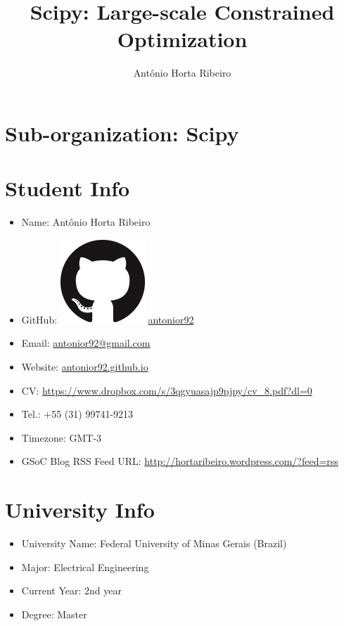 \documentclass[11pt]{article}
\title{Scipy: Large-scale Constrained Optimization}
\author{Ant\^{o}nio Horta Ribeiro}
\date{}
\begin{document}
\maketitle

\section*{Sub-organization: Scipy}

\section*{Student Info}

\begin{itemize}
\item
  Name: Ant\^{o}nio Horta Ribeiro
\item
  GitHub: \includegraphics[height=\baselineskip]{GH.png} \href{https://github.com/antonior92}{antonior92}
\item
  Email: \href{mailto:antonior92@gmail.com}{antonior92@gmail.com}
\item
  Website: \href{https://antonior92.github.io}{antonior92.github.io}
\item
  CV: \href{https://www.dropbox.com/s/3qgyuasajp9pjpy/cv_8.pdf?dl=0}{https://www.dropbox.com/s/3qgyuasajp9pjpy/cv\_8.pdf?dl=0}
\item
  Tel.: +55 (31) 99741-9213
\item
  Timezone: GMT-3
\item
  GSoC Blog RSS Feed URL:  \href{http://hortaribeiro.wordpress.com/?feed=rss}{http://hortaribeiro.wordpress.com/?feed=rss}
\end{itemize}


\section*{University Info}

\begin{itemize}
\item
  University Name: Federal University of Minas Gerais (Brazil)
\item
  Major: Electrical Engineering
\item
  Current Year: 2nd year
\item
  Degree: Master
\end{itemize}
\end{document}
